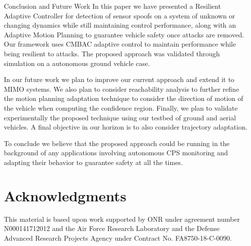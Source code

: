 \vspace{-3pt}
\begin{section}{Conclusion and Future Work} \label{sec:conclusion}
In this paper we have presented a Resilient Adaptive Controller for detection of sensor spoofs on a system of unknown or changing dynamics while still maintaining control performance, along with an Adaptive Motion Planning to guarantee vehicle safety once attacks are removed. Our framework uses CMBAC adaptive control to maintain performance while being resilient to attacks. The proposed approach was validated through simulation on a autonomous ground vehicle case. 

In our future work we plan to improve our current approach and extend it to MIMO systems. We also plan to consider reachability analysis to further refine the motion planning adaptation technique to consider the direction of motion of the vehicle when computing the confidence region. Finally, we plan to validate experimentally the proposed technique using our testbed of ground and aerial vehicles. A final objective in our horizon is to also consider trajectory adaptation.

To conclude we believe that the proposed approach could be running in the background of any applications involving autonomous CPS monitoring and adapting their behavior to guarantee safety at all the times.


\end{section}
 \vspace{-0pt}
\section*{Acknowledgments} 
 \vspace{-5pt}
This material is based upon work supported by ONR under agreement number N000141712012 and 
the Air Force Research Laboratory and the Defense Advanced Research Projects Agency under Contract No. FA8750-18-C-0090. 
 \vspace{-5pt}


